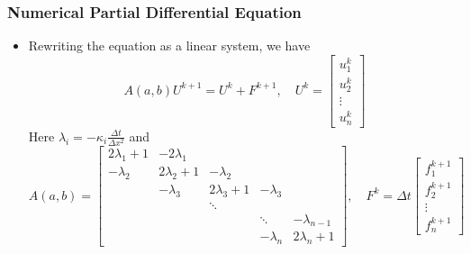\documentclass{beamer}
\begin{document}
\begin{frame}
	\frametitle{Numerical Partial Differential Equation}
	
	\begin{itemize}
		\item Rewriting the equation as a linear system, we have
		$$A(a,b)U^{k+1} = U^k + F^{k+1}, \quad U^k = \begin{bmatrix}u_1^k\\u_2^k\\\vdots \\u_n^k\end{bmatrix}$$
		Here $\lambda_i = -\kappa_i \frac{\Delta t}{\Delta x^2}$ and 
		{\footnotesize
		\begin{equation*}
		A(a,b) = \begin{bmatrix}
2\lambda_1+1 & -2\lambda_1  &  & & \\
-\lambda_2 & 2\lambda_2+1 & -\lambda_2 & & \\
 & -\lambda_3 & 2\lambda_3 + 1 & -\lambda_3 & \\
& &\ddots & & \\
& & &\ddots & -\lambda_{n-1}\\
&&& -\lambda_n & 2\lambda_n+1
\end{bmatrix},\quad F^k = \Delta t \begin{bmatrix}
f_1^{k+1} \\
f_2^{k+1} \\
\vdots\\
f_n^{k+1}
\end{bmatrix}	
		\end{equation*}
		}
		
	\end{itemize}
\end{frame}
\end{document}
